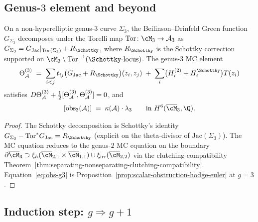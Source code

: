 \subsection{Genus-$3$ element and beyond}
\label{subsec:theta-A-g3}

\begin{proposition}
\label{prop:theta-A-genus3}
On a non-hyperelliptic genus-$3$ curve $\Sigma_{3}$, the
Beilinson--Drinfeld Green function $G_{\Sigma_{3}}$ decomposes under
the Torelli map $\mathrm{Tor}\colon\cM_{3}\to\cA_{3}$ as
$G_{\Sigma_{3}}=G_{\mathrm{Jac}}|_{\mathrm{Tor}(\Sigma_{3})}+
R_{\Schottky}$, where $R_{\Schottky}$ is the Schottky correction
supported on $\cM_{3}\setminus\mathrm{Tor}^{-1}(\Schottky\text{-locus})$.
The genus-$3$ MC element
\begin{equation}\label{eq:theta-A-g3}
\Theta_\cA^{(3)}
\;=\;
\sum_{i<j} t_{ij}\bigl(G_{\mathrm{Jac}}+R_{\Schottky}\bigr)(z_{i},z_{j})
\;+\;
\sum_{i}\bigl(H_{i}^{(2)}+H_{i}^{\Schottky}\bigr)T(z_{i})
\end{equation}
satisfies
$D\Theta_{\mathcal{A}}^{(3)}+\tfrac{1}{2}[\Theta_{\mathcal{A}}^{(3)},\Theta_{\mathcal{A}}^{(3)}]=0$,
and
\begin{equation}\label{eq:obs-g3}
[\mathrm{obs}_{3}(\cA)]
\;=\;
\kscal(\cA)\cdot\lambda_{3}
\qquad \textup{in } H^{6}(\overline{\cM}_{3},\Q).
\end{equation}
\end{proposition}

\begin{proof}
The Schottky decomposition is Schottky's identity
$G_{\Sigma_{3}}-\mathrm{Tor}^{*}G_{\mathrm{Jac}}=R_{\Schottky}$
\textup{(}explicit on the theta-divisor of
$\mathrm{Jac}(\Sigma_{3})$\textup{)}. The MC equation reduces to the
genus-$2$ MC equation on the boundary
$\partial\overline{\cM}_{3}\supset\xi_{h}(\overline{\cM}_{2,1}
\times\overline{\cM}_{1,1})\cup\xi_{\mathrm{irr}}(\overline{\cM}_{2,2})$
via the clutching-compatibility
Theorem~\ref{thm:separating-nonseparating-clutching-compatibility}.
Equation~\eqref{eq:obs-g3} is
Proposition~\ref{prop:scalar-obstruction-hodge-euler} at $g=3$.
\end{proof}

\subsection{Induction step: $g \Rightarrow g+1$}
\label{subsec:theta-A-induction}

